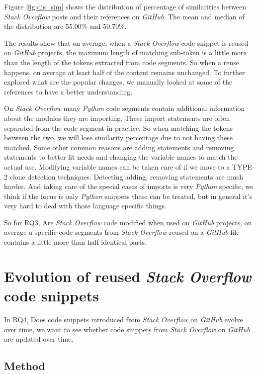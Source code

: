 \documentclass[sigconf]{acmart}
\begin{document}
Figure \ref{fig:dis_sim} shows the distribution of percentage of similarities between \textit{Stack Overflow} posts and their references on \textit{GitHub}. The mean and median of the distribution are 55.00\% and 50.70\%.

The results show that on average, when a \textit{Stack Overflow} code snippet is reused on \textit{GitHub} projects, the maximum length of matching sub-token is a little more than the length of the tokens extracted from code segments. So when a reuse happens, on average at least half of the content remains unchanged. To further explored what are the popular changes, we manually looked at some of the references to have a better understanding. 

On \textit{Stack Overflow} many \textit{Python} code segments contain additional information about the modules they are importing. These import statements are often separated from the code segment in practice. So when matching the tokens between the two, we will lose similarity percentage due to not having these matched. Some other common reasons are adding statements and removing statements to better fit needs and changing the variable names to match the actual use. Modifying variable names can be taken care of if we move to a \textsc{TYPE-2} clone detection techniques. Detecting adding, removing statements are much harder. And taking care of the special cases of imports is very \textit{Python} specific, we think if the focus is only \textit{Python} snippets these can be treated, but in general it's very hard to deal with those language specific things.

So for RQ3, Are \textit{Stack Overflow} code modified when used on \textit{GitHub} projects, on average a specific code segments from \textit{Stack Overflow} reused on a \textit{GitHub} file contains a little more than half identical parts.

\section{Evolution of reused \textit{Stack Overflow} code snippets}

In RQ4, Does code snippets introduced from \textit{Stack Overflow} on \textit{GitHub} evolve over time, we want to see whether code snippets from \textit{Stack Overflow} on \textit{GitHub} are updated over time. 

\subsection{Method}
\end{document}

